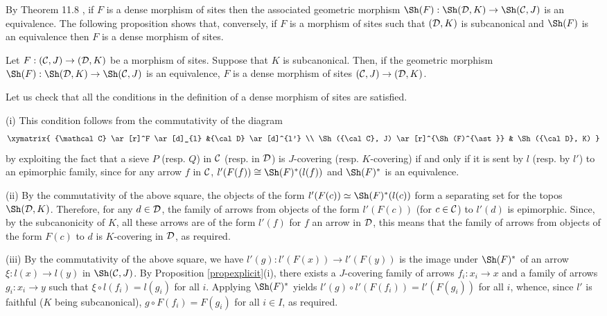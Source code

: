 \documentclass[a4paper,12pt]{article}
\begin{document}
By Theorem 11.8 \cite{Shulman}, if $F$ is a dense morphism of sites then the associated geometric morphism $\Sh(F):\Sh({\cal D}, K)\to \Sh({\cal C}, J)$ is an equivalence. The following proposition shows that, conversely, if $F$ is a morphism of sites such that $({\cal D}, K)$ is subcanonical and $\Sh(F)$ is an equivalence then $F$ is a dense morphism of sites.

\begin{proposition}\label{propdensitysubcanonical}
	Let $F:({\cal C}, J)\to ({\cal D}, K)$ be a morphism of sites. Suppose that $K$ is subcanonical. Then, if the geometric morphism $\Sh(F):\Sh({\cal D}, K)\to \Sh({\cal C}, J)$ is an equivalence, $F$ is a dense morphism of sites $({\cal C}, J)\to ({\cal D}, K)$. 
\end{proposition}

\begin{proofs}
	Let us check that all the conditions in the definition of a dense morphism of sites are satisfied.
	
	(i) This condition follows from the commutativity of the diagram
	$$
	\xymatrix{
		{\mathcal C} \ar[r]^F \ar[d]_{l} &{\cal D} \ar[d]^{l'} \\
		\Sh({\cal C}, J) \ar[r]^{\Sh(F)^{\ast}} & \Sh({\cal D}, K)
	}
	$$
	by exploiting the fact that a sieve $P$ (resp. $Q$) in $\cal C$ (resp. in $\cal D$) is $J$-covering (resp. $K$-covering) if and only if it is sent by $l$ (resp. by $l'$) to an epimorphic family, since for any arrow $f$ in $\cal C$, $l'(F(f))\cong \Sh(F)^{\ast}(l(f))$ and $\Sh(F)^{\ast}$ is an equivalence.
	
	(ii) By the commutativity of the above square, the objects of the form $l'(F(c))\simeq \Sh(F)^{\ast}(l(c))$ form a separating set for the topos $\Sh({\cal D}, K)$. Therefore, for any $d\in {\cal D}$, the family of arrows from objects of the form $l'(F(c))$ (for $c\in {\cal C}$) to $l'(d)$ is epimorphic. Since, by the subcanonicity of $K$, all these arrows are of the form $l'(f)$ for $f$ an arrow in $\cal D$, this means that the family of arrows from objects of the form $F(c)$ to $d$ is $K$-covering in $\cal D$, as required.  
	
	(iii) By the commutativity of the above square, we have $l'(g):l'(F(x))\to l'(F(y))$ is the image under $\Sh(F)^{\ast}$ of an arrow $\xi:l(x)\to l(y)$ in $\Sh({\cal C}, J)$. By Proposition \ref{propexplicit}(i), there exists a $J$-covering family of arrows $f_{i}:x_{i}\to x$ and a family of arrows $g_{i}:x_{i}\to y$ such that $\xi \circ l(f_{i})=l(g_{i})$ for all $i$. Applying $\Sh(F)^{\ast}$ yields $l'(g)\circ  l'(F(f_{i}))=l'(F(g_{i}))$ for all $i$, whence, since $l'$ is faithful ($K$ being subcanonical), $g\circ  F(f_{i})= F(g_{i})$ for all $i\in I$, as required.   
\end{proofs}
\end{document}
